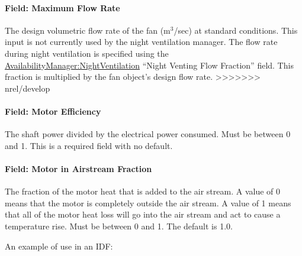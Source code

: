 \paragraph{Field: Maximum Flow Rate}\label{field-maximum-flow-rate-4}

The design volumetric flow rate of the fan (m\(^{3}\)/sec) at standard conditions. This input is not currently used by the night ventilation manager. The flow rate during night ventilation is specified using the \hyperref[availabilitymanagernightventilation]{AvailabilityManager:NightVentilation} ``Night Venting Flow Fraction'' field. This fraction is multiplied by the fan object's design flow rate.
>>>>>>> nrel/develop

\paragraph{Field: Motor Efficiency}\label{field-motor-efficiency-3}

The shaft power divided by the electrical power consumed. Must be between 0 and 1. This is a required field with no default.

\paragraph{Field: Motor in Airstream Fraction}\label{field-motor-in-airstream-fraction-3}

The fraction of the motor heat that is added to the air stream. A value of 0 means that the motor is completely outside the air stream. A value of 1 means that all of the motor heat loss will go into the air stream and act to cause a temperature rise. Must be between 0 and 1. The default is 1.0.

An example of use in an IDF:

